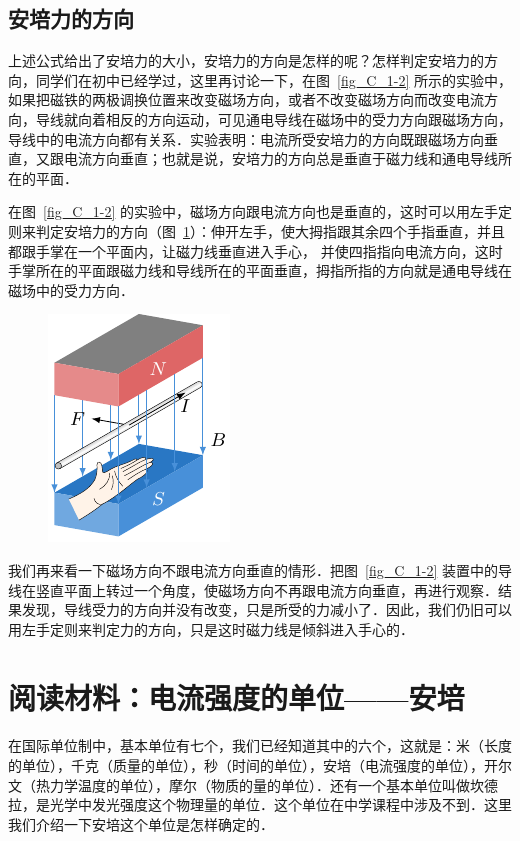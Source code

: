 \subsection{安培力的方向}


上述公式给出了安培力的大小，安培力的方向是怎样的呢？怎样判定安培力的方向，同学们在初中已经学过，这里再讨论一下，在图~\ref{fig_C_1-2} 所示的实验中，如果把磁铁的两极调换位置来改变磁场方向，或者不改变磁场方向而改变电流方向，导线就向着相反的方向运动，可见通电导线在磁场中的受力方向跟磁场方向，导线中的电流方向都有关系．实验表明：电流所受安培力的方向既跟磁场方向垂直，又跟电流方向垂直；也就是说，安培力的方向总是垂直于磁力线和通电导线所在的平面．

在图~\ref{fig_C_1-2} 的实验中，磁场方向跟电流方向也是垂直的，这时可以用左手定则来判定安培力的方向（图~\ref{fig_C_1-22}）：伸开左手，使大拇指跟其余四个手指垂直，并且都跟手掌在一个平面内，让磁力线垂直进入手心，
并使四指指向电流方向，这时手掌所在的平面跟磁力线和导线所在的平面垂直，拇指所指的方向就是通电导线在磁场中的受力方向．
\begin{figure}[htbp]
    \centering
    \includegraphics{fig/C/1-22.pdf}
    \caption{}\label{fig_C_1-22}
\end{figure}

我们再来看一下磁场方向不跟电流方向垂直的情形．把图~\ref{fig_C_1-2} 装置中的导线在竖直平面上转过一个角度，使磁场方向不再跟电流方向垂直，再进行观察．结果发现，导线受力的方向并没有改变，只是所受的力减小了．因此，我们仍旧可以用左手定则来判定力的方向，只是这时磁力线是倾斜进入手心的．

\section*{阅读材料：电流强度的单位——安培}
在国际单位制中，基本单位有七个，我们已经知道其中的六个，这就是：米（长度的单位），千克（质量的单位），秒（时间的单位），安培（电流强度的单位），开尔文（热力学温度的单位），摩尔（物质的量的单位）．还有一个基本单位叫做坎德拉，是光学中发光强度这个物理量的单位．这个单位在中学课程中涉及不到．这里我们介绍一下安培这个单位是怎样确定的．

